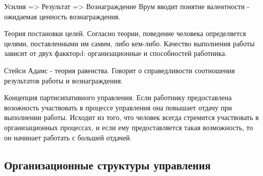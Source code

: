 \documentclass[a4paper,12pt]{report}
\begin{document}
	Усилия => Результат => Вознаграждение
	Врум вводит понятие валентности - ожидаемая ценность вознаграждения.


	Теория постановки целей.
	Согласно теории, поведение человека определяется целями, поставленными им самим, либо кем-либо.
	Качество выполнения работы зависит от двух факкторd: организационные и способностей работника.



	Стейси Адамс - теория равенства.
	Говорит о справедливости соотношения результатов работы и вознаграждения.

	Концепция партисипативного управления.
	Если работнику предоставлена возожность участвовать в процессе управления она повышает отдачу при выполнении
	 работы. Исходит из того, что человек всегда стремится участвовать в организационных процессах, и если ему
	 предоставляется такая возможность, то он начинает работать с большей отдачей.




\subsection{Организационные структуры управления}
\end{document}
